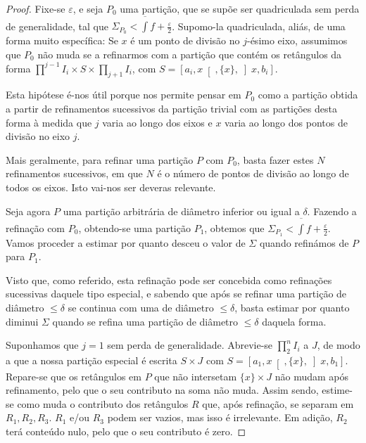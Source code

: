 \documentclass{article}
\begin{document}
	\begin{proof}
	Fixe-se $\varepsilon$, e seja $P_0$ uma partição, que se supõe ser quadriculada sem perda de generalidade, tal que $\Sigma_{P_0} < \overline{\int} f + \frac \varepsilon 2$. Supomo-la quadriculada, aliás, de uma forma muito específica: Se $x$ é um ponto de divisão no $j$-ésimo eixo, assumimos que $P_0$ não muda se a refinarmos com a partição que contém os retângulos da forma $\prod^{j-1} I_i \times S \times \prod_{j+1} I_i$, com $S = \left[a_i, x\right[, \{x\}, \left]x, b_i \right]$.
	
	Esta hipótese é-nos útil porque nos permite pensar em $P_0$ como a partição obtida a partir de refinamentos sucessivos da partição trivial com as partições desta forma à medida que $j$ varia ao longo dos eixos e $x$ varia ao longo dos pontos de divisão no eixo $j$.
	
	Mais geralmente, para refinar uma partição $P$ com $P_0$, basta fazer estes $N$ refinamentos sucessivos, em que $N$ é o número de pontos de divisão ao longo de todos os eixos. Isto vai-nos ser deveras relevante.
	
	Seja agora $P$ uma partição arbitrária de diâmetro inferior ou igual a $\delta$. Fazendo a refinação com $P_0$, obtendo-se uma partição $P_1$, obtemos que \linebreak $\Sigma_{P_1} < \overline{\int} f + \frac \varepsilon 2$. Vamos proceder a estimar por quanto desceu o valor de $\Sigma$ quando refinámos de $P$ para $P_1$.
	
	Visto que, como referido, esta refinação pode ser concebida como refinações sucessivas daquele tipo especial, e sabendo que após se refinar uma partição de diâmetro $\leq \delta$ se continua com uma de diâmetro $\leq \delta$, basta estimar por quanto diminui $\Sigma$ quando se refina uma partição de diâmetro $\leq \delta$ daquela forma.
	
	Suponhamos que $j = 1$ sem perda de generalidade. Abrevie-se $\prod_2^n I_i$ a $J$, de modo a que a nossa partição especial é escrita $S \times J$ com $S = \left[a_1, x\right[, \{x\}, \left]x, b_1 \right]$. Repare-se que os retângulos em $P$ que não intersetam $\{x\} \times J$ não mudam após refinamento, pelo que o seu contributo na soma não muda. Assim sendo, estime-se como muda o contributo dos retângulos $R$ que, após refinação, se separam em $R_1, R_2, R_3$. $R_1$ e/ou $R_3$ podem ser vazios, mas isso é irrelevante. Em adição, $R_2$ terá conteúdo nulo, pelo que o seu contributo é zero.
	

\end{proof}
\end{document}
